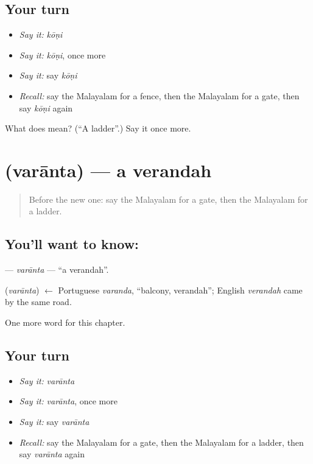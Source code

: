 \subsection*{Your turn}
\begin{itemize}
\raggedright
  \item \emph{Say it:} \emph{kōṇi}
  \item \emph{Say it:} \emph{kōṇi}, once more
  \item \emph{Say it:} say \emph{kōṇi}
  \item \emph{Recall:} say the Malayalam for a fence, then the Malayalam for a gate, then say \emph{kōṇi} again
\end{itemize}

\begin{tcolorbox}[breakable,colback=teal!4,colframe=teal!35!black,title={Before you move on}]
What does  mean? (\textquotedblleft{}A ladder\textquotedblright{}.) Say it once more.
\end{tcolorbox}
\section[\texorpdfstring{\ml{വരാന്ത} (varānta)}{വരാന്ത (varānta)}]{ (varānta) — a verandah}

\label{lesson:ML-C160-varanta}



\begin{quote}
Before the new one: say the Malayalam for a gate, then the Malayalam for a ladder.
\end{quote}

\subsection*{You'll want to know: }
\textbf{} — \emph{varānta} — \textquotedblleft{}a verandah\textquotedblright{}.

\begin{cousinweb}
\textbf{} (\emph{varānta}) $\leftarrow$ Portuguese \emph{varanda}, \textquotedblleft{}balcony, verandah\textquotedblright{}; English \emph{verandah} came by the same road.
\end{cousinweb}

\begin{grammarlens}[title={What you've built}]
One more word for this chapter.
\end{grammarlens}

\subsection*{Your turn}
\begin{itemize}
\raggedright
  \item \emph{Say it:} \emph{varānta}
  \item \emph{Say it:} \emph{varānta}, once more
  \item \emph{Say it:} say \emph{varānta}
  \item \emph{Recall:} say the Malayalam for a gate, then the Malayalam for a ladder, then say \emph{varānta} again
\end{itemize}

